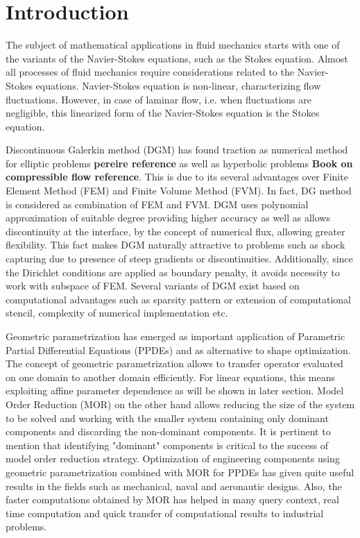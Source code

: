 \documentclass[graybox]{svmult}
\begin{document}
\section{Introduction}
\label{introduction}

The subject of mathematical applications in fluid mechanics starts with one of the variants of the Navier-Stokes equations, such as the Stokes equation. Almost all processes of fluid mechanics require considerations related to the Navier-Stokes equations. Navier-Stokes equation is non-linear, characterizing flow fluctuations. However, in case of laminar flow, i.e. when fluctuations are negligible, this linearized form of the Navier-Stokes equation is the Stokes equation.

Discontinuous Galerkin method (DGM) has found traction as numerical method for elliptic problems \textbf{pereire reference} as well as hyperbolic problems \textbf{Book on compressible flow reference}. This is due to its several advantages over Finite Element Method (FEM) and Finite Volume Method (FVM). In fact, DG method is considered as combination of FEM and FVM. DGM uses polynomial approximation of suitable degree providing higher accuracy as well as allows discontinuity at the interface, by the concept of numerical flux, allowing greater flexibility. This fact makes DGM naturally attractive to problems such as shock capturing due to presence of steep gradients or discontinuities. Additionally, since the Dirichlet conditions are applied as boundary penalty, it avoids necessity to work with subspace of FEM. Several variants of DGM exist based on computational advantages such as sparsity pattern or extension of computational stencil, complexity of numerical implementation etc.

Geometric parametrization has emerged as important application of Parametric Partial Differential Equations (PPDEs) and as alternative to shape optimization. The concept of geometric parametrization allows to transfer operator evaluated on one domain to another domain efficiently. For linear equations, this means exploiting affine parameter dependence as will be shown in later section. Model Order Reduction (MOR) on the other hand allows reducing the size of the system to be solved and working with the smaller system containing only dominant components and discarding the non-dominant components. It is pertinent to mention that identifying "dominant" components is critical to the success of model order reduction strategy. Optimization of engineering components using geometric parametrization combined with MOR for PPDEs has given quite useful results in the fields such as mechanical, naval and aeronautic designs. Also, the  faster computations obtained by MOR has helped in many query context, real time computation and quick transfer of computational results to industrial problems.
\end{document}
